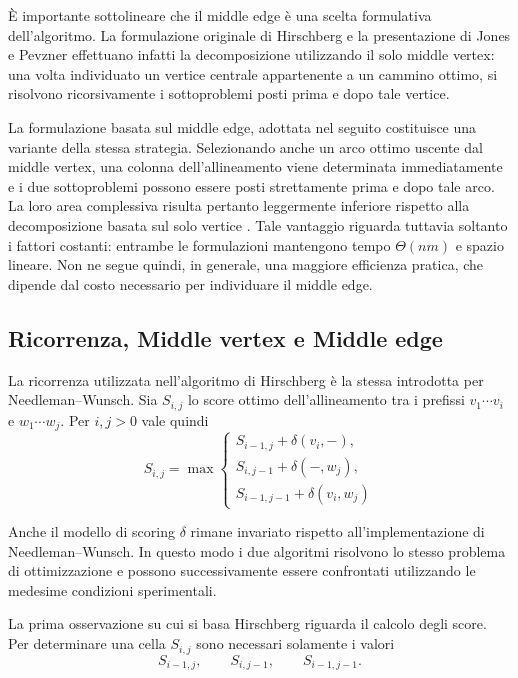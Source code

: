 È importante sottolineare che il middle edge è una scelta formulativa dell'algoritmo.
La formulazione originale di Hirschberg e la presentazione di Jones e Pevzner \cite{hirschberg,jones--pevzner} effettuano
infatti la decomposizione utilizzando il solo middle vertex: una volta individuato un vertice centrale
appartenente a un cammino ottimo, si risolvono ricorsivamente i sottoproblemi posti prima e dopo tale vertice.

La formulazione basata sul middle edge, adottata nel seguito
costituisce una variante della stessa strategia. Selezionando anche un arco ottimo uscente dal middle vertex, una colonna
dell'allineamento viene determinata immediatamente e i due sottoproblemi possono essere posti strettamente prima e dopo tale arco.
La loro area complessiva risulta pertanto leggermente inferiore rispetto alla decomposizione basata sul solo vertice \cite[pp.~275--276]{compeau--pevzner}.
Tale vantaggio riguarda tuttavia soltanto i fattori costanti: entrambe le formulazioni mantengono tempo $\Theta(nm)$ e spazio lineare.
Non ne segue quindi, in generale, una maggiore efficienza pratica, che dipende dal costo necessario per individuare il middle edge.

\subsection{Ricorrenza, Middle vertex e Middle edge}

La ricorrenza utilizzata nell'algoritmo di Hirschberg è la stessa introdotta per Needleman--Wunsch.
Sia $S_{i,j}$ lo score ottimo dell'allineamento tra i prefissi $v_{1}\cdots v_{i}$ e $w_{1}\cdots w_{j}$.
Per $i,j>0$ vale quindi
\[
    S_{i,j}
    =
    \max
    \begin{cases}
        S_{i-1,j}+\delta(v_i,-),\\
        S_{i,j-1}+\delta(-,w_j),\\
        S_{i-1,j-1}+\delta(v_i,w_j)
    \end{cases}
\]

Anche il modello di scoring $\delta$ rimane invariato rispetto
all'implementazione di Needleman--Wunsch. In questo modo i due algoritmi risolvono
lo stesso problema di ottimizzazione e possono successivamente essere confrontati
utilizzando le medesime condizioni sperimentali.

La prima osservazione su cui si basa Hirschberg riguarda il calcolo degli score.
Per determinare una cella $S_{i,j}$ sono necessari solamente i valori
\[
    S_{i-1,j}, \qquad S_{i,j-1}, \qquad S_{i-1,j-1}.
\]

